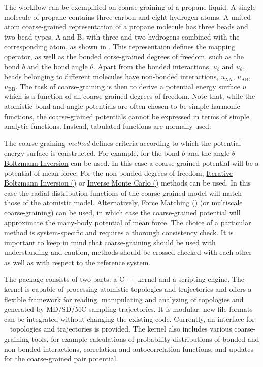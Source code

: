 The workflow can be exemplified on coarse-graining of a propane liquid. A single molecule of propane contains three carbon and eight hydrogen atoms. A united atom coarse-grained representation of a propane molecule has three beads and two bead types, A and B, with three and two hydrogens combined with the corresponding atom, as shown in . This representaion defines the \hyperref[sec:mapping_operator]{mapping operator}, as well as the bonded corse-grained degrees of freedom, such as the bond $b$ and the bond angle $\theta$. Apart from the bonded interactions, $u_b$ and $u_\theta$, beads belonging to different molecules have non-bonded interactions, $u_\text{AA}$, $u_\text{AB}$, $u_\text{BB}$. The task of coarse-graining is then to derive a potential energy surface $u$ which is a function of all coarse-grained degrees of freedom. Note that, while the atomistic bond and angle potentials are often chosen to be simple harmonic functions, the coarse-grained potentials cannot be expressed in terms of simple analytic functions. Instead, tabulated functions are normally used.

The coarse-graining {\em method} defines criteria according to which the potential energy surface is constructed. For example, for the bond $b$ and the angle $\theta$  \hyperref[sec:bi]{Boltzmann Inversion} can be used. In this case a coarse-grained potential will be a potential of mean force. For the non-bonded degrees of freedom,
\hyperref[sec:ibi]{Iterative Boltzmann Inversion (\ibi)} or \hyperref[sec:imc]{Inverse Monte Carlo (\imc)} methods can be used. In this case the radial distribution functions of the coarse-grained model will match those of the atomistic model. Alternatively, \hyperref[sec:fm]{Force Matching (\fm)} (or multiscale coarse-graining) can be used, in which case the coarse-grained potential will approximate the many-body potential of mean force. The choice of a particular method is system-specific and requires a thorough consistency check. It is important to keep in mind that coarse-graining should be used with understanding and caution, methods should be crossed-checked with each other as well as with respect to the reference system.

The package consists of two parts: a C++ kernel and a scripting engine. The kernel is capable of processing atomistic topologies and trajectories and offers a flexible framework for reading, manipulating and analyzing of topologies and generated by MD/SD/MC sampling trajectories. It is modular: new file formats can be integrated without changing the existing code. Currently, an interface for \gromacs~\cite{gromacs4} topologies and trajectories is provided.
%
The kernel also includes various coarse-graining tools, for example calculations of probability distributions of bonded and non-bonded interactions, correlation and autocorrelation functions, and updates for the coarse-grained pair potential.

